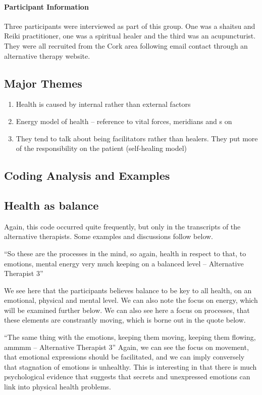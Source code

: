 \paragraph{Participant Information}

Three participants were interviewed as part of this group. One was a shaitsu and Reiki practitioner, one was a spiritual healer and the third was an acupuncturist. They were all recruited from the Cork area following email contact through an alternative therapy website. 

\subsection{Major Themes}
\begin{enumerate}
\item Health is caused by internal rather than external factors
\item Energy model of health – reference to vital forces, meridians and s on
\item They tend to talk about being facilitators rather than healers. They put more of the responsibility on the patient (self-healing model)
\end{enumerate}

\subsection{Coding Analysis and Examples}




\subsection{Health as balance}

Again, this code occurred quite frequently, but only in the transcripts of the alternative therapists. Some examples and discussions follow below. 

``So these are the processes in the mind, so again, health in respect to that, to emotions, mental energy very much keeping on a balanced level – Alternative Therapist 3''

We see here that the participants believes balance to be key to all health, on an emotional, physical and mental level. We can also note the focus on energy, which will be examined further below. We can also see here a focus on processes, that these elements are constrantly moving, which is borne out in the quote below. 

``The same thing with the emotions, keeping them moving, keeping them flowing, ammmm – Alternative Therapist 3''
Again, we can see the focus on movement, that emotional expressions should be facilitated, and we can imply conversely that stagnation of emotions is unhealthy. This is interesting in that there is much psychological evidence that suggests that secrets and unexpressed emotions can link into physical health problems. 

